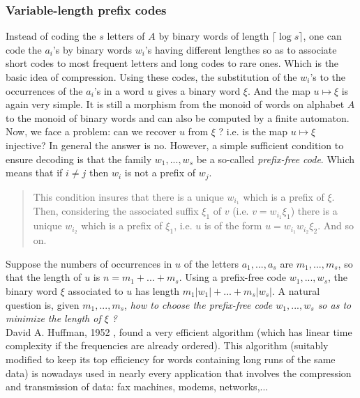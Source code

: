 \subsubsection{Variable-length prefix codes}\label{sss:varlength}
Instead of coding the $s$ letters of $A$ by binary words of length
$\lceil\log s\rceil$, one can code the $a_i$'s by binary words $w_i$'s
having different lengthes so as to associate
short codes to most frequent letters and long codes to rare ones.
Which is the basic idea of compression.
Using these codes, the substitution of the $w_i$'s to the
occurrences of the $a_i$'s in a word $u$ gives a binary word $\xi$.
And the map $u\mapsto\xi$ is again very simple.
It is still a morphism from the monoid of words on alphabet $A$
to the monoid of binary words
and can also be computed by a finite automaton.
\\
Now, we face a problem: can we recover $u$ from $\xi$ ?
i.e. is the map $u\mapsto \xi$ injective?
In general the answer is no.
However, a simple sufficient condition to ensure decoding
is that the family $w_1,...,w_s$ be a so-called
{\em prefix-free code}.
Which means that if $i\neq j$ then $w_i$ is not a prefix of $w_j$.
{\small\begin{quote}
This condition insures that there is a unique $w_{i_1}$
which is a prefix of $\xi$. 
Then, considering the associated suffix $\xi_1$ of $v$
(i.e. $v=w_{i_1}\xi_1$) there is a unique $w_{i_2}$
which is a prefix of $\xi_1$, i.e. $u$ is of the form
$u=w_{i_1}w_{i_2}\xi_2$.
And so on.
\end{quote}}
\noindent
Suppose the numbers of occurrences in $u$ of the letters
$a_1,...,a_s$ are $m_1,...,m_s$,
so that the length of $u$ is $n=m_1+...+m_s$.
Using a prefix-free code $w_1,...,w_s$, the binary word $\xi$
associated to $u$ has length $m_1|w_1|+...+m_s|w_s|$.
A natural question is, given $m_1,...,m_s$,
{\em how to choose the prefix-free code $w_1,...,w_s$
so as to minimize the length of $\xi$ ?}
\\
David A. Huffman, 1952 \cite{huffman}, found a very efficient
algorithm (which has linear time complexity if the frequencies
are already ordered).
This algorithm (suitably modified to keep its top efficiency
for words containing long runs of the same data)
is nowadays used in nearly every application
that involves the compression and transmission of data:
fax machines, modems, networks,...
